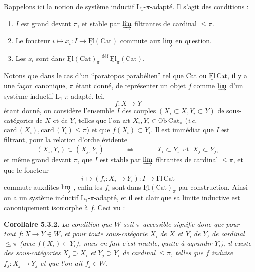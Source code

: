 \documentclass[11pt]{article}
\newcommand{\msp}[1]{\marginpar{\footnotesize [#1]}}
\newcommand{\uFl}{\underline{\mathrm{Fl}}}
\begin{document}
Rappelons ici la notion de système inductif L$_1$-$\pi$-adapté. Il s'agit des conditions :
\begin{enumerate}[label={}]
\item[1°)] $I$ est grand devant $\pi$, et stable par $\varinjlim$ filtrantes de cardinal $\leq \pi$.
\item[2°)] Le foncteur $i \longmapsto x_i : I \longrightarrow \uFl(\mathrm{Cat})$ commute aux $\varinjlim$ en question.
\item[3°)] Les $x_i$ sont dans $\uFl(\mathrm{Cat})_\pi \overset{\text{déf}}{=} \uFl_\pi(\mathrm{Cat})$.
\end{enumerate}
Notons que dans le cas d'un ``paratopos parabélien'' tel que Cat ou $\uFl\,\mathrm{Cat}$, il y a une façon canonique, $\pi$ étant donné, de représenter un objet $f$ comme $\varinjlim$ d'un système inductif L$_1$-$\pi$-adapté. Ici,
\[
f : X \longrightarrow Y
\]
étant donné, on considère l'ensemble $I$ des
\msp{page 78}
couples $(X_i \subset X, Y_i \subset Y)$ de sous-catégories de $X$ et de $Y$, telles que l'on ait $X_i, Y_i \in \mathrm{Ob}\,\mathrm{Cat}_\pi$ (\textit{i.e.} $\mathrm{card}\,(X_i), \mathrm{card}\,(Y_i) \leq \pi$) et que $f(X_i) \subset Y_i$. Il est immédiat que $I$ est filtrant, pour la relation d'ordre évidente
\[
(X_i, Y_i) \subset (X_j, Y_j) \qquad\quad \Longleftrightarrow \qquad\quad X_i \subset Y_i \ \text{ et } \ X_j \subset Y_j, %
\]
et même grand devant $\pi$, que $I$ est stable par $\varinjlim$ filtrantes de cardinal $\leq \pi$, et que le foncteur
\[
i \longmapsto (f_i : X_i \longrightarrow Y_i) : I \longrightarrow \uFl\,\mathrm{Cat}
\]
commute auxdites $\varinjlim$ , enfin les $f_i$ sont dans $\uFl(\mathrm{Cat})_\pi$ par construction. Ainsi on a un système inductif L$_1$-$\pi$-adapté, et il est clair que sa limite inductive est canoniquement isomorphe à $f$. Ceci vu :

\textbf{Corollaire 5.3.2.} \textit{La condition que $W$ soit $\pi$-accessible signifie donc que pour tout $f : X \longrightarrow Y \in W$, et pour toute sous-catégorie $X_i$ de $X$ et $Y_i$ de $Y$, de cardinal $\leq \pi$ (avec $f(X_i) \subset Y_i$), mais en fait c'est inutile, quitte à agrandir $Y_i$), il existe des sous-catégories} %
\msp{page 79}
\textit{$X_j \supset X_i$ et $Y_j \supset Y_i$ de cardinal $\leq \pi$, telles que $f$ induise $f_j : X_j \longrightarrow Y_j$ et que l'on ait $f_j \in W$.}
\end{document}
